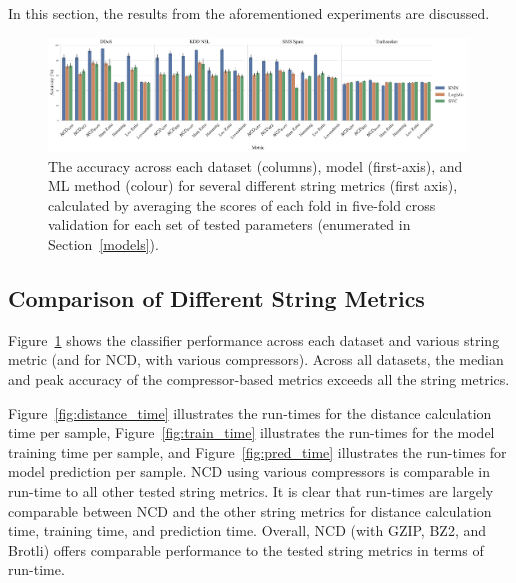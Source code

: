 \documentclass[preprint,12pt]{article}
\begin{document}
In this section, the results from the aforementioned experiments are discussed. 


\begin{figure}[p]
    \centering
    \includegraphics[width=0.99\textwidth]{images/accuracy_vs_metric.pdf}
    \caption{The accuracy across each dataset (columns), model (first-axis), and ML method (colour) for several different string metrics (first axis), calculated by averaging the scores of each fold in five-fold cross validation for each set of tested parameters (enumerated in Section~\ref{models}).}
    \label{fig:metric_acc}
\end{figure}



\subsection{Comparison of Different String Metrics}

Figure~\ref{fig:metric_acc} shows the classifier performance across each dataset and various string metric (and for NCD, with various compressors).
Across all datasets, the median and peak accuracy of the compressor-based metrics exceeds all the string metrics.

Figure~\ref{fig:distance_time} illustrates the run-times for the distance calculation time per sample, Figure~\ref{fig:train_time} illustrates the run-times for the model training time per sample, and Figure~\ref{fig:pred_time} illustrates the run-times for model prediction per sample.
NCD using various compressors is comparable in run-time to all other tested string metrics.
It is clear that run-times are largely comparable between NCD and the other string metrics for distance calculation time, training time, and prediction time.
Overall, NCD (with GZIP, BZ2, and Brotli) offers comparable performance to the tested string metrics in terms of run-time. 
\end{document}

